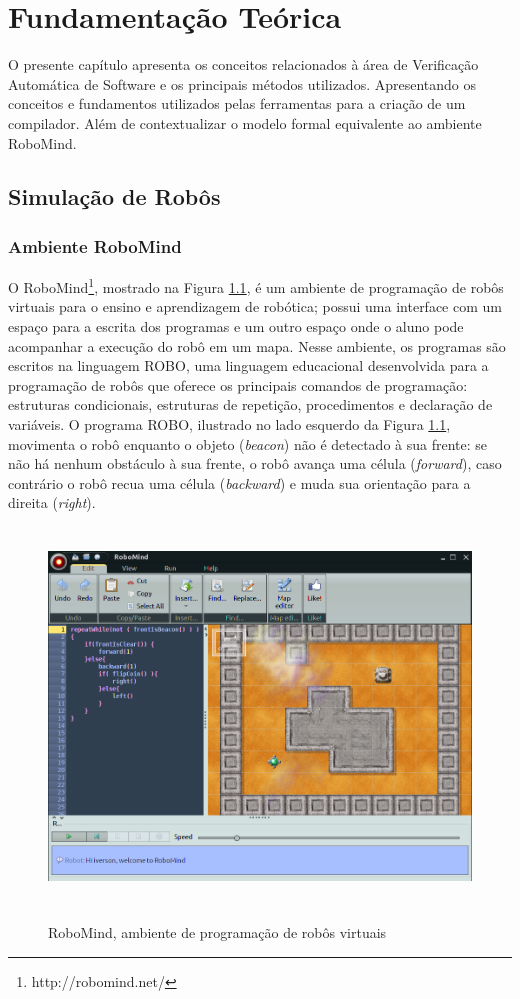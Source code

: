\chapter{Fundamentação Teórica}
\label{chap:cap2}
O presente capítulo apresenta os conceitos relacionados à área de Verificação Automática de Software e os principais métodos utilizados. Apresentando os conceitos e fundamentos utilizados pelas ferramentas para a criação de um compilador. Além de contextualizar o modelo formal equivalente ao ambiente RoboMind.

\section{Simulação de Robôs}

\subsection{Ambiente RoboMind}
O RoboMind\footnote[2]{http://robomind.net/}, mostrado na Figura \ref{fig:robomind}, é um ambiente de programação de robôs virtuais para o ensino e aprendizagem de robótica; possui uma interface com um espaço para a escrita dos programas e um outro espaço onde o aluno pode acompanhar a execução do robô em um mapa. Nesse ambiente, os programas são escritos na linguagem ROBO, uma linguagem educacional desenvolvida para a programação de robôs que oferece os principais comandos de programação: estruturas condicionais, estruturas de repetição, procedimentos e declaração de variáveis. O programa ROBO, ilustrado no lado esquerdo da Figura \ref{fig:robomind}, movimenta o robô enquanto o objeto (\textit{beacon}) não é detectado à sua frente: se não há nenhum obstáculo à sua frente, o robô avança uma célula (\textit{forward}), caso contrário o robô recua uma célula (\textit{backward}) e muda sua orientação para a direita (\textit{right}).

\begin{figure}[h]
\centering
\caption{RoboMind, ambiente de programação de robôs virtuais}
\includegraphics[height=10cm]{figuras/robomind_ide3.png}
\label{fig:robomind}
\end{figure}

